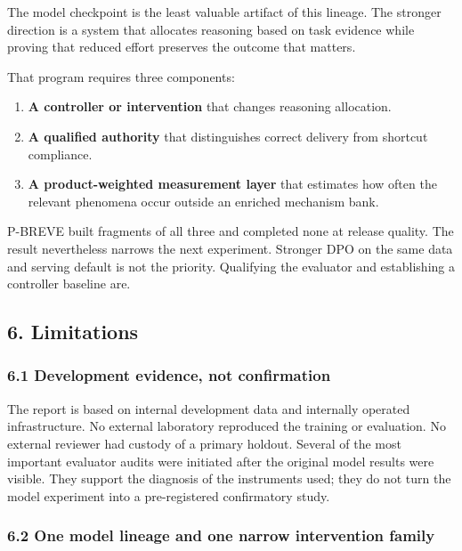 \documentclass[
  9pt,
  letterpaper,
]{article}
\providecommand{\tightlist}{%
  \setlength{\itemsep}{0pt}\setlength{\parskip}{0pt}}
\begin{document}
The model checkpoint is the least valuable artifact of this lineage. The
stronger direction is a system that allocates reasoning based on task
evidence while proving that reduced effort preserves the outcome that
matters.

That program requires three components:

\begin{enumerate}
\def\labelenumi{\arabic{enumi}.}
\tightlist
\item
  \textbf{A controller or intervention} that changes reasoning
  allocation.
\item
  \textbf{A qualified authority} that distinguishes correct delivery
  from shortcut compliance.
\item
  \textbf{A product-weighted measurement layer} that estimates how often
  the relevant phenomena occur outside an enriched mechanism bank.
\end{enumerate}

P-BREVE built fragments of all three and completed none at release
quality. The result nevertheless narrows the next experiment. Stronger
DPO on the same data and serving default is not the priority. Qualifying
the evaluator and establishing a controller baseline are.

\hypertarget{6-limitations}{%
\subsection{6. Limitations}\label{6-limitations}}

\hypertarget{61-development-evidence-not-confirmation}{%
\subsubsection{6.1 Development evidence, not
confirmation}\label{61-development-evidence-not-confirmation}}

The report is based on internal development data and internally operated
infrastructure. No external laboratory reproduced the training or
evaluation. No external reviewer had custody of a primary holdout.
Several of the most important evaluator audits were initiated after the
original model results were visible. They support the diagnosis of the
instruments used; they do not turn the model experiment into a
pre-registered confirmatory study.

\hypertarget{62-one-model-lineage-and-one-narrow-intervention-family}{%
\subsubsection{6.2 One model lineage and one narrow intervention
family}\label{62-one-model-lineage-and-one-narrow-intervention-family}}
\end{document}
